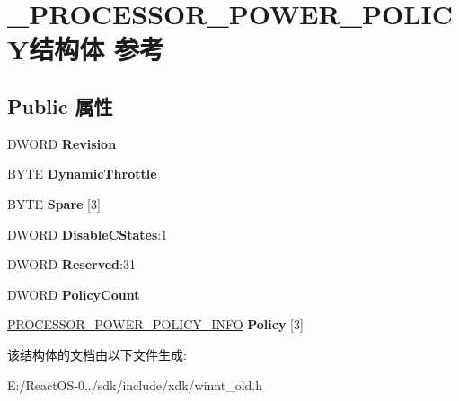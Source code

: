 \hypertarget{struct___p_r_o_c_e_s_s_o_r___p_o_w_e_r___p_o_l_i_c_y}{}\section{\+\_\+\+P\+R\+O\+C\+E\+S\+S\+O\+R\+\_\+\+P\+O\+W\+E\+R\+\_\+\+P\+O\+L\+I\+C\+Y结构体 参考}
\label{struct___p_r_o_c_e_s_s_o_r___p_o_w_e_r___p_o_l_i_c_y}
\subsection*{Public 属性}
\begin{DoxyCompactItemize}
\item 
\mbox{\label{struct___p_r_o_c_e_s_s_o_r___p_o_w_e_r___p_o_l_i_c_y_acd8d320a69b218e51c5057a606765827}} 
D\+W\+O\+RD {\bfseries Revision}
\item 
\mbox{\label{struct___p_r_o_c_e_s_s_o_r___p_o_w_e_r___p_o_l_i_c_y_a3aaf25822521e56065cccb032c347fae}} 
B\+Y\+TE {\bfseries Dynamic\+Throttle}
\item 
\mbox{\label{struct___p_r_o_c_e_s_s_o_r___p_o_w_e_r___p_o_l_i_c_y_a6965b3d1b68fb1f18847213319b83bdc}} 
B\+Y\+TE {\bfseries Spare} \mbox{[}3\mbox{]}
\item 
\mbox{\label{struct___p_r_o_c_e_s_s_o_r___p_o_w_e_r___p_o_l_i_c_y_a52516cc97d9610d40e51361c438c16eb}} 
D\+W\+O\+RD {\bfseries Disable\+C\+States}\+:1
\item 
\mbox{\label{struct___p_r_o_c_e_s_s_o_r___p_o_w_e_r___p_o_l_i_c_y_acdf71b08f69d07645862c990e74636d3}} 
D\+W\+O\+RD {\bfseries Reserved}\+:31
\item 
\mbox{\label{struct___p_r_o_c_e_s_s_o_r___p_o_w_e_r___p_o_l_i_c_y_a709e5b0b9fd774be01343bb5b5245e68}} 
D\+W\+O\+RD {\bfseries Policy\+Count}
\item 
\mbox{\label{struct___p_r_o_c_e_s_s_o_r___p_o_w_e_r___p_o_l_i_c_y_a8ad7f4d0de2431a922cb6866095941bd}} 
\hyperlink{struct___p_r_o_c_e_s_s_o_r___p_o_w_e_r___p_o_l_i_c_y___i_n_f_o}{P\+R\+O\+C\+E\+S\+S\+O\+R\+\_\+\+P\+O\+W\+E\+R\+\_\+\+P\+O\+L\+I\+C\+Y\+\_\+\+I\+N\+FO} {\bfseries Policy} \mbox{[}3\mbox{]}
\end{DoxyCompactItemize}


该结构体的文档由以下文件生成\+:\begin{DoxyCompactItemize}
\item 
E\+:/\+React\+O\+S-\/0../sdk/include/xdk/winnt\+\_\+old.\+h\end{DoxyCompactItemize}
